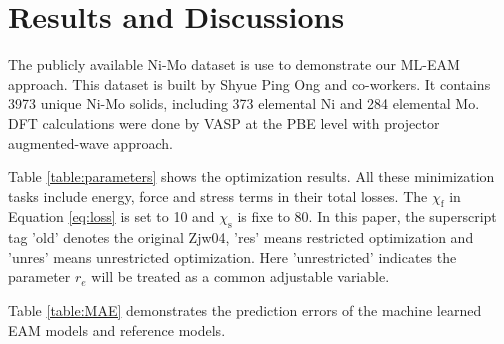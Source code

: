 \documentclass[prb,reprint]{revtex4-2}
\begin{document}
% 
%
\section{Results and Discussions}
\label{sec:results}

The publicly available Ni-Mo dataset is use to demonstrate our ML-EAM approach. 
This dataset is built by Shyue Ping Ong and co-workers. It contains 3973 unique
Ni-Mo solids, including 373 elemental Ni and 284 elemental Mo. DFT calculations 
were done by VASP at the PBE level with projector augmented-wave approach.

Table \ref{table:parameters} shows the optimization results. All these 
minimization tasks include energy, force and stress terms in their total losses.
The $\chi_{\mathrm{f}}$ in Equation \ref{eq:loss} is set to 10 and 
$\chi_{\mathrm{s}}$ is fixe to 80. In this paper, the superscript tag 'old' 
denotes the original Zjw04, 'res' means restricted optimization and 'unres' 
means unrestricted optimization. Here 'unrestricted' indicates the parameter 
$r_e$ will be treated as a common adjustable variable.

Table \ref{table:MAE} demonstrates the prediction errors of the machine learned
EAM models and reference models. 
\end{document}

